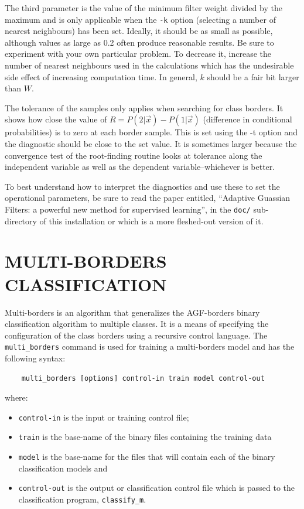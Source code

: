\documentclass[12pt]{article}
\begin{document}
  The third parameter is the value of the minimum filter weight divided by the maximum and is only applicable when the \verb/-k/ option (selecting a number of nearest neighbours) has been set.  Ideally, it should be as small as possible, although values as large as 0.2 often produce reasonable results.  Be sure to experiment with your own particular problem.  To decrease it, increase the number of nearest neighbours used in the calculations which has the undesirable side effect of increasing computation time.  In general, $k$ should be a fair bit larger than $W$.

  The tolerance of the samples only applies when searching for class borders.  It shows how close the value of $R=P(2|\vec x)-P(1|\vec x)$ (difference in conditional probabilities) is to zero at each border sample.  This is set using the -t option and the diagnostic should be close to the set value.  It is sometimes larger because the convergence test of the root-finding routine looks at tolerance along the independent variable as well as the dependent variable--whichever is better.

  To best understand how to interpret the diagnostics and use these to set the operational parameters, be sure to read the paper entitled, ``Adaptive Guassian Filters: a powerful new method for supervised learning'', in the \verb|doc/| sub-directory of this installation or \citet{Mills2011} which is a more fleshed-out version of it.


\section{MULTI-BORDERS CLASSIFICATION}

\label{MULTI_BORDERS_CLASSIFICATION}

  Multi-borders is an algorithm that generalizes the AGF-borders binary classification algorithm to multiple classes.  It is a means of specifying the configuration of the class borders using a recursive control language.  The \verb/multi_borders/ command is used for training a multi-borders model and has the following syntax:
\begin{verbatim}
    multi_borders [options] control-in train model control-out
\end{verbatim}
where:
\begin{itemize}
\item \verb$control-in$ is the input or training control file; 
\item \verb$train$ is the base-name of the binary files containing the training data
\item \verb$model$ is the base-name for the files that will contain each of the binary classification models and 
\item \verb$control-out$ is the output or classification control file which is passed to the classification program, \verb/classify_m/.
\end{itemize}
\end{document}
